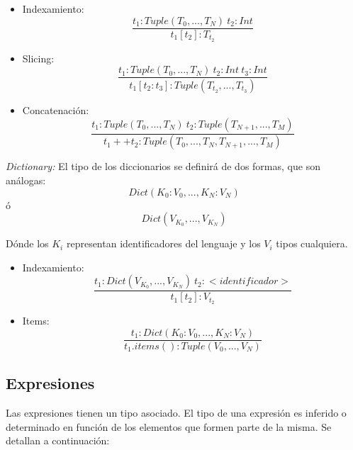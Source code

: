 \documentclass[12pt, spanish]{report}
\begin{document}
\begin{itemize}
\item Indexamiento:
  \begin{equation}
    \frac{t_1: Tuple(T_0, ..., T_N)\ t_2: Int}{t_1[t_2]: T_{t_{2}}}
  \end{equation}

\item Slicing:
  \begin{equation}
    \frac{t_1: Tuple(T_0, ..., T_N)\ t_2: Int\ t_3: Int}{t_1[t_2:t_3]: Tuple(T_{t_{2}}, ..., T_{t_{3}})}
  \end{equation}

\item Concatenaci\'on:
  \begin{equation}
    \frac{t_1: Tuple(T_0, ..., T_N)\ t_2: Tuple(T_{N+1}, ..., T_M)}{t_1 ++ t_2: Tuple(T_0, ..., T_N, T_{N+1}, ..., T_M)}
  \end{equation}
\end{itemize}

\emph{Dictionary:}
El tipo de los diccionarios se definir\'a de dos formas, que son an\'alogas:
\begin{equation}
  Dict(K_0:V_0, ..., K_N:V_N)
\end{equation}
ó
\begin{equation}
  Dict(V_{K_0}, ..., V_{K_N})
\end{equation}

D\'onde los $K_i$ representan identificadores del lenguaje y los $V_i$
tipos cualquiera.

\begin{itemize}
\item Indexamiento:
  \begin{equation}
    \frac{t_1: Dict(V_{K_0}, ..., V_{K_N})\ t_2: <identificador>}{t_1[t_2]: V_{t_{2}}}
  \end{equation}

\item Items:
  \begin{equation}
    \frac{t_1: Dict(K_0:V_0, ..., K_N:V_N)}{t_1.items(): Tuple(V_0, ..., V_N)}
  \end{equation}

\end{itemize}

\subsection{Expresiones}
\label{sec:expr}

Las expresiones tienen un tipo asociado. El tipo de una expresi\'on es
inferido o determinado en funci\'on de los elementos que formen parte
de la misma. Se detallan a continuaci\'on:
\end{document}
